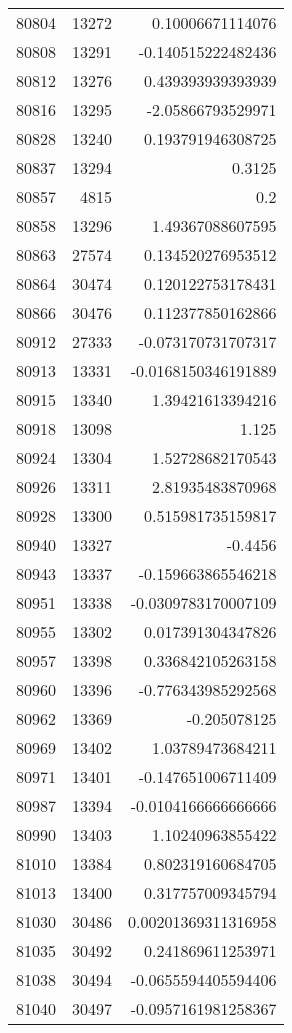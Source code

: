 \begin{tabular}{r | r | r}
80804 & 13272 & 0.10006671114076 \\
80808 & 13291 & -0.140515222482436 \\
80812 & 13276 & 0.439393939393939 \\
80816 & 13295 & -2.05866793529971 \\
80828 & 13240 & 0.193791946308725 \\
80837 & 13294 & 0.3125 \\
80857 & 4815 & 0.2 \\
80858 & 13296 & 1.49367088607595 \\
80863 & 27574 & 0.134520276953512 \\
80864 & 30474 & 0.120122753178431 \\
80866 & 30476 & 0.112377850162866 \\
80912 & 27333 & -0.073170731707317 \\
80913 & 13331 & -0.0168150346191889 \\
80915 & 13340 & 1.39421613394216 \\
80918 & 13098 & 1.125 \\
80924 & 13304 & 1.52728682170543 \\
80926 & 13311 & 2.81935483870968 \\
80928 & 13300 & 0.515981735159817 \\
80940 & 13327 & -0.4456 \\
80943 & 13337 & -0.159663865546218 \\
80951 & 13338 & -0.0309783170007109 \\
80955 & 13302 & 0.017391304347826 \\
80957 & 13398 & 0.336842105263158 \\
80960 & 13396 & -0.776343985292568 \\
80962 & 13369 & -0.205078125 \\
80969 & 13402 & 1.03789473684211 \\
80971 & 13401 & -0.147651006711409 \\
80987 & 13394 & -0.0104166666666666 \\
80990 & 13403 & 1.10240963855422 \\
81010 & 13384 & 0.802319160684705 \\
81013 & 13400 & 0.317757009345794 \\
81030 & 30486 & 0.00201369311316958 \\
81035 & 30492 & 0.241869611253971 \\
81038 & 30494 & -0.0655594405594406 \\
81040 & 30497 & -0.0957161981258367 \\

\end{tabular}
